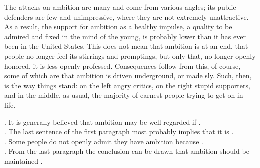 The attacks on ambition are many and come from various angles; its public defenders are few and unimpressive, where they are not extremely unattractive. As a result, the support for ambition as a healthy impulse, a quality to be admired and fixed in the mind of the young, is probably lower than it has ever been in the United States. This does not mean that ambition is at an end, that people no longer feel its stirrings and promptings, but only that, no longer openly honored, it is less openly professed. Consequences follow from this, of course, some of which are that ambition is driven underground, or made sly. Such, then, is the way things stand: on the left angry critics, on the right stupid supporters, and in the middle, as usual, the majority of earnest people trying to get on in life.
\begin{questions}   .	It is generally believed that ambition may be well regarded if \ltk{}.\\
    .	The last sentence of the first paragraph most probably implies that it is \ltk{}.\\
    .	Some people do not openly admit they have ambition because \ltk{}.\\
    .	From the last paragraph the conclusion can be drawn that ambition should be maintained \ltk{}.\\
\end{questions}